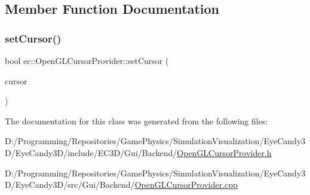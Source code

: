 \subsection{Member Function Documentation}
\mbox{\label{classec_1_1_open_g_l_cursor_provider_a1eadfdfdfeaac9f932bad8e16edfab3b}} 
\subsubsection{\texorpdfstring{set\+Cursor()}{setCursor()}}
{\footnotesize\ttfamily bool ec\+::\+Open\+G\+L\+Cursor\+Provider\+::set\+Cursor (\begin{DoxyParamCaption}\item[{Cursor\+Enum}]{cursor }\end{DoxyParamCaption})\hspace{0.3cm}{\ttfamily [override]}}



The documentation for this class was generated from the following files\+:\begin{DoxyCompactItemize}
\item 
D\+:/\+Programming/\+Repositories/\+Game\+Physics/\+Simulation\+Visualization/\+Eye\+Candy3\+D/\+Eye\+Candy3\+D/include/\+E\+C3\+D/\+Gui/\+Backend/\mbox{\hyperlink{_open_g_l_cursor_provider_8h}{Open\+G\+L\+Cursor\+Provider.\+h}}\item 
D\+:/\+Programming/\+Repositories/\+Game\+Physics/\+Simulation\+Visualization/\+Eye\+Candy3\+D/\+Eye\+Candy3\+D/src/\+Gui/\+Backend/\mbox{\hyperlink{_open_g_l_cursor_provider_8cpp}{Open\+G\+L\+Cursor\+Provider.\+cpp}}\end{DoxyCompactItemize}
